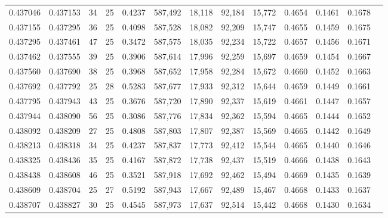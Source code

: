 \begin{tabular}{rrrrrrrrrrrrr}
0.437046 & 0.437153 &    34 &  25 &                                     0.4237 & 587,492 &  18,118 &  92,184 &  15,772 & 0.4654 & 0.1461 & 0.1678 \\
0.437155 & 0.437295 &    36 &  25 &                                     0.4098 & 587,528 &  18,082 &  92,209 &  15,747 & 0.4655 & 0.1459 & 0.1675 \\
0.437295 & 0.437461 &    47 &  25 &                                     0.3472 & 587,575 &  18,035 &  92,234 &  15,722 & 0.4657 & 0.1456 & 0.1671 \\
0.437462 & 0.437555 &    39 &  25 &                                     0.3906 & 587,614 &  17,996 &  92,259 &  15,697 & 0.4659 & 0.1454 & 0.1667 \\
0.437560 & 0.437690 &    38 &  25 &                                     0.3968 & 587,652 &  17,958 &  92,284 &  15,672 & 0.4660 & 0.1452 & 0.1663 \\
0.437692 & 0.437792 &    25 &  28 &                                     0.5283 & 587,677 &  17,933 &  92,312 &  15,644 & 0.4659 & 0.1449 & 0.1661 \\
0.437795 & 0.437943 &    43 &  25 &                                     0.3676 & 587,720 &  17,890 &  92,337 &  15,619 & 0.4661 & 0.1447 & 0.1657 \\
0.437944 & 0.438090 &    56 &  25 &                                     0.3086 & 587,776 &  17,834 &  92,362 &  15,594 & 0.4665 & 0.1444 & 0.1652 \\
0.438092 & 0.438209 &    27 &  25 &                                     0.4808 & 587,803 &  17,807 &  92,387 &  15,569 & 0.4665 & 0.1442 & 0.1649 \\
0.438213 & 0.438318 &    34 &  25 &                                     0.4237 & 587,837 &  17,773 &  92,412 &  15,544 & 0.4665 & 0.1440 & 0.1646 \\
0.438325 & 0.438436 &    35 &  25 &                                     0.4167 & 587,872 &  17,738 &  92,437 &  15,519 & 0.4666 & 0.1438 & 0.1643 \\
0.438438 & 0.438608 &    46 &  25 &                                     0.3521 & 587,918 &  17,692 &  92,462 &  15,494 & 0.4669 & 0.1435 & 0.1639 \\
0.438609 & 0.438704 &    25 &  27 &                                     0.5192 & 587,943 &  17,667 &  92,489 &  15,467 & 0.4668 & 0.1433 & 0.1637 \\
0.438707 & 0.438827 &    30 &  25 &                                     0.4545 & 587,973 &  17,637 &  92,514 &  15,442 & 0.4668 & 0.1430 & 0.1634 \\

\end{tabular}
